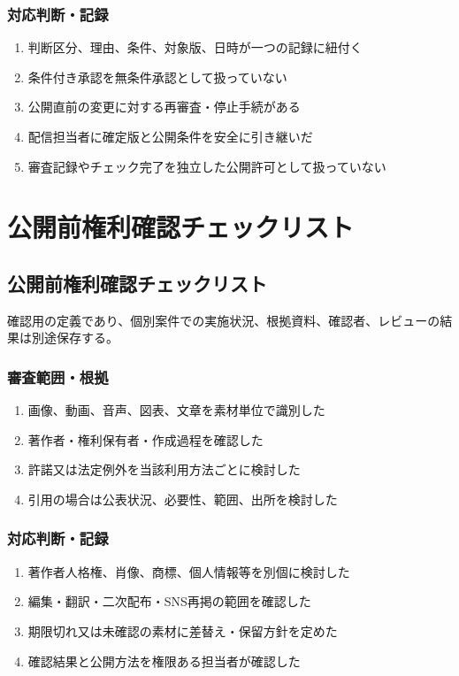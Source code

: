 \documentclass[a4paper,11pt]{article}
\begin{document}
\subsubsection*{対応判断・記録}
\begin{enumerate}[leftmargin=2em,itemsep=0.3em]
\item 判断区分、理由、条件、対象版、日時が一つの記録に紐付く\par
\item 条件付き承認を無条件承認として扱っていない\par
\item 公開直前の変更に対する再審査・停止手続がある\par
\item 配信担当者に確定版と公開条件を安全に引き継いだ\par
\item 審査記録やチェック完了を独立した公開許可として扱っていない\par
\end{enumerate}
\section{公開前権利確認チェックリスト}
\subsection{公開前権利確認チェックリスト}
\par 確認用の定義であり、個別案件での実施状況、根拠資料、確認者、レビューの結果は別途保存する。\par\medskip
\subsubsection*{審査範囲・根拠}
\begin{enumerate}[leftmargin=2em,itemsep=0.3em]
\item 画像、動画、音声、図表、文章を素材単位で識別した\par
\item 著作者・権利保有者・作成過程を確認した\par
\item 許諾又は法定例外を当該利用方法ごとに検討した\par
\item 引用の場合は公表状況、必要性、範囲、出所を検討した\par
\end{enumerate}
\subsubsection*{対応判断・記録}
\begin{enumerate}[leftmargin=2em,itemsep=0.3em]
\item 著作者人格権、肖像、商標、個人情報等を別個に検討した\par
\item 編集・翻訳・二次配布・SNS再掲の範囲を確認した\par
\item 期限切れ又は未確認の素材に差替え・保留方針を定めた\par
\item 確認結果と公開方法を権限ある担当者が確認した\par
\end{enumerate}
\end{document}
